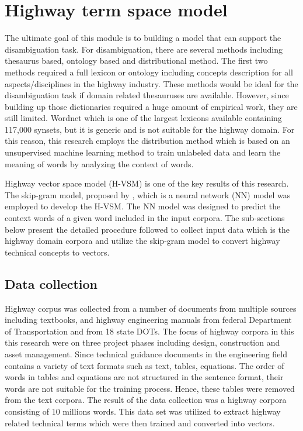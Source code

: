 \documentclass[Journal, InsideFigs, DoubleSpace]{ascelike} %
\begin{document}
\section{Highway term space model} \label{sec:vector-space}
%
The ultimate goal of this module is to building a model that can support the disambiguation task. For disambiguation, there are several methods including thesaurus based, ontology based and distributional method. The first two methods required a full lexicon or ontology including concepts description for all aspects/disciplines in the highway industry. These methods would be ideal for the disambiguation task if domain related thesauruses are available. However, since building up those dictionaries required a huge amount of empirical work, they are still limited. Wordnet \cite{Miller95} which is one of the largest lexicons available containing 117,000 synsets, but it is generic and is not suitable for the highway domain. For this reason, this research employs the distribution method which is based on an unsupervised machine learning method to train unlabeled data and learn the meaning of words by analyzing the context of words.
\par
Highway vector space model (H-VSM) is one of the key results of this research. The skip-gram model, proposed by , which is a neural network (NN) model was employed to develop the H-VSM. The NN model was designed to predict the context words of a given word included in the input corpora. The sub-sections below present the detailed procedure followed to collect input data which is the highway domain corpora and utilize the skip-gram model to convert highway technical concepts to vectors.
%
\subsection{Data collection}
Highway corpus was collected from a number of documents from multiple sources including textbooks, and highway engineering manuals from federal Department of Transportation and from 18 state DOTs. The focus of highway corpora in this this research were on three  project phases including design, construction and asset management. Since technical guidance documents in the engineering field contains a variety of text formats such as text, tables, equations. The order of words in tables and equations are not structured in the sentence format, their words are not suitable for the training process. Hence, these tables were removed from the text corpora. The result of the data collection was a highway corpora consisting of 10 millions words. This data set was utilized to extract highway related technical terms which were then trained and converted into vectors. 
\end{document}
